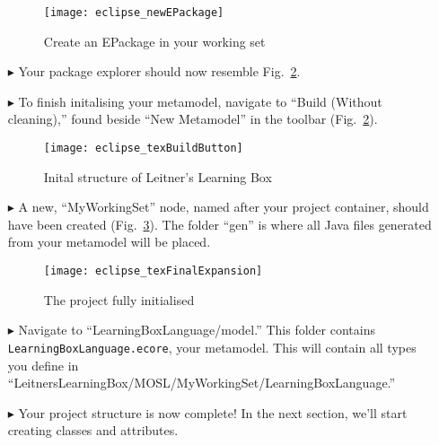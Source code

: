 \begin{itemize}
\vspace{0.5cm}

\begin{figure}[htbp]
	\centering
  \texttt{[image: eclipse\_newEPackage]}
	\caption{Create an EPackage in your working set}
	\label{eclipse:newEPackage}
\end{figure} 

\clearpage

\item[$\blacktriangleright$] Your package explorer should now resemble Fig.~\ref{eclipse:preBuild}.

\item[$\blacktriangleright$] To finish initalising your metamodel, navigate to ``Build (Without cleaning),'' found beside ``New Metamodel'' in the
toolbar (Fig.~\ref{eclipse:preBuild}).

\begin{figure}[htbp]
	\centering
  \texttt{[image: eclipse\_texBuildButton]}
	\caption{Inital structure of Leitner's Learning Box}
	\label{eclipse:preBuild}
\end{figure} 

\vspace{0.5cm}

\item[$\blacktriangleright$] A new, ``MyWorkingSet'' node, named after your project container, should have been created (Fig.~\ref{eclipse:finalFiles}). The
folder ``gen'' is where all Java files generated from your metamodel will be placed.

\vspace{0.5cm}

\begin{figure}[h!]
	\centering
  \texttt{[image: eclipse\_texFinalExpansion]}
	\caption{The project fully initialised}
	\label{eclipse:finalFiles}
\end{figure} 

\vspace{0.5cm}

\item[$\blacktriangleright$] Navigate to ``LearningBoxLanguage/model.'' This folder contains \\ \texttt{LearningBoxLanguage.ecore}, your metamodel. This will
contain all types you define in ``LeitnersLearningBox/MOSL/MyWorkingSet/LearningBoxLanguage.''

\item[$\blacktriangleright$] Your project structure is now complete! In the next section, we'll start creating classes and attributes.


\end{itemize}
